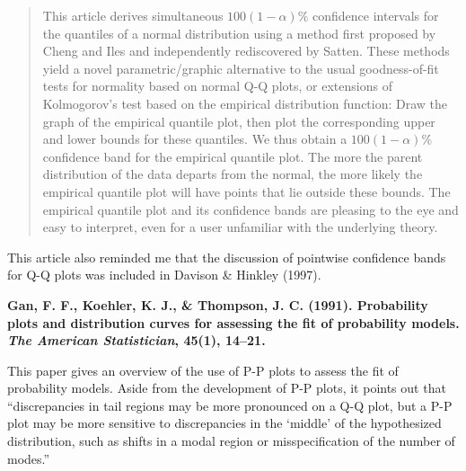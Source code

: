 \documentclass{article}
\begin{document}
\begin{quote}
This article derives simultaneous $100( 1 - \alpha )\%$ confidence intervals for the quantiles of a normal distribution using a method first proposed by Cheng and Iles and independently rediscovered by Satten. These methods yield a novel parametric/graphic alternative to the usual goodness-of-fit tests for normality based on normal Q-Q plots, or extensions of Kolmogorov's test based on the empirical distribution function: Draw the graph of the empirical quantile plot, then plot the corresponding upper and lower bounds for these quantiles. We thus obtain a $100( 1 - \alpha )\%$ confidence band for the empirical quantile plot. The more the parent distribution of the data departs from the normal, the more likely the empirical quantile plot will have points that lie outside these bounds. The empirical quantile plot and its confidence bands are pleasing to the eye and easy to interpret, even for a user unfamiliar with the underlying theory.
\end{quote}

This article also reminded me that the discussion of pointwise confidence bands for Q-Q plots was included in Davison \& Hinkley (1997).

\bigskip

{\bf Gan, F. F., Koehler, K. J., \& Thompson, J. C. (1991). Probability plots and distribution curves for assessing the fit of probability models. \emph{The American Statistician}, 45(1), 14--21.}

This paper gives an overview of the use of P-P plots to assess the fit of probability models. Aside from the development of P-P plots, it points out that ``discrepancies in tail regions may be more pronounced on a Q-Q plot, but a P-P plot may be more sensitive to discrepancies in the `middle' of the hypothesized distribution, such as shifts in a modal region or misspecification of the number of modes.''
\end{document}
